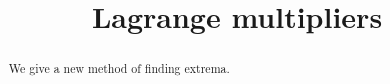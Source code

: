 \documentclass{ximera}
\title[Dig-In:]{Lagrange multipliers}
\begin{document}
\begin{abstract}
  We give a new method of finding extrema. 
\end{abstract}
\maketitle
\end{document}
